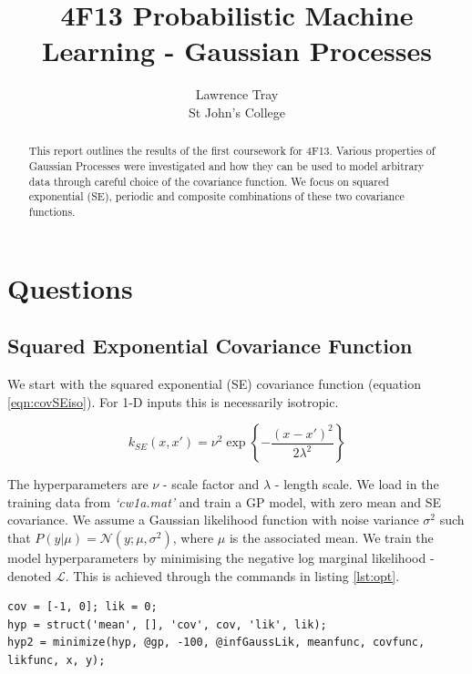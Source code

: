 \documentclass[]{article}
\title{4F13 Probabilistic Machine Learning - Gaussian Processes}
\author{Lawrence Tray \\ St John's College}
\newcommand{\Ncal}{\mathcal{N}}
\newcommand{\Lcal}{\mathcal{L}}
\begin{document}
\maketitle

\begin{abstract}
This report outlines the results of the first coursework for 4F13. Various properties of Gaussian Processes were investigated and how they can be used to model arbitrary data through careful choice of the covariance function. We focus on squared exponential (SE), periodic and composite combinations of these two covariance functions.
\end{abstract}

\tableofcontents

\section{Questions}
\subsection{Squared Exponential Covariance Function}

We start with the squared exponential (SE) covariance function (equation \ref{eqn:covSEiso}). For 1-D inputs this is necessarily isotropic.

\begin{equation}
k_{SE}(x, x') = \nu^2 \exp\left\{- \frac{(x-x')^2}{2\lambda^2}\right\}
\label{eqn:covSEiso}
\end{equation}

The hyperparameters are $\nu$ - scale factor and $\lambda$ - length scale. We load in the training data from \textit{`cw1a.mat'} and train a GP model, with zero mean and SE covariance. We assume a Gaussian likelihood function with noise variance $\sigma^2$ such that $P(y|\mu) = \Ncal(y; \mu, \sigma^2)$, where $\mu$ is the associated mean. We train the model hyperparameters by minimising the negative log marginal likelihood - denoted $\Lcal$. This is achieved through the commands in listing \ref{lst:opt}.

\begin{lstlisting}[frame=single, caption={Hyperparameter optimisation}, label={lst:opt}]
cov = [-1, 0]; lik = 0;
hyp = struct('mean', [], 'cov', cov, 'lik', lik);
hyp2 = minimize(hyp, @gp, -100, @infGaussLik, meanfunc, covfunc, likfunc, x, y);
\end{lstlisting}
\end{document}
